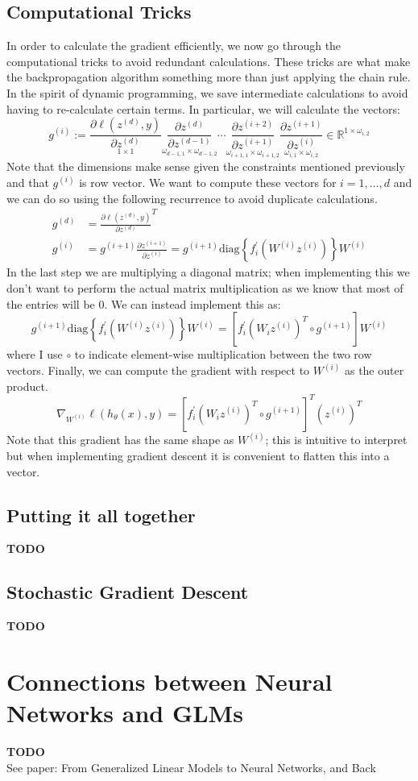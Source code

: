 \documentclass[12pt]{article}
\newcommand{\R}{\mathcal{R}}
\def\R{\mathbb{R}}
\begin{document}
\subsection{Computational Tricks}
In order to calculate the gradient efficiently, we now go through the computational tricks to avoid redundant calculations. These tricks are what make the backpropagation algorithm something more than 
just applying the chain rule. In the spirit of dynamic programming, we save intermediate calculations to avoid having to re-calculate certain terms. In particular, we will calculate the vectors: 
\[g^{(i)} := \underset{1 \times 1}{\frac{\partial \ell(z^{(d)}, y)}{\partial z^{(d)}}} \underset{\omega_{d - 1, 1} \times \omega_{d - 1, 2}}{\frac{\partial z^{(d)}}{\partial z^{(d - 1)}}} \cdots \underset{\omega_{i + 1, 1} \times \omega_{i + 1, 2}}{\frac{\partial z^{(i + 2)}}{\partial z^{(i + 1)}}}  \underset{\omega_{i, 1} \times \omega_{i, 2}}{\frac{\partial z^{(i + 1)}}{\partial z^{(i)}}} \in \R^{1 \times \omega_{i, 2}} \]
Note that the dimensions make sense given the constraints mentioned previously and that $g^{(i)}$ is row vector. We want to compute these vectors for $i = 1, \dots, d$ and we can do so using the following 
recurrence to avoid duplicate calculations. 
\begin{align*}
g^{(d)} &= \frac{\partial \ell(z^{(d)}, y)}{\partial z^{(d)}}^T \\
g^{(i)} &= g^{(i + 1)} \frac{\partial z^{(i + 1)}}{\partial z^{(i)}} = g^{(i + 1)} \text{diag}\left\{f_{i}^\prime(W^{(i)}z^{(i)})\right\} W^{(i)}
\end{align*}
In the last step we are multiplying a diagonal matrix; when implementing this we don't want to perform the actual matrix multiplication as we know that most of the entries will be $0$. We can instead implement
this as: 
\[g^{(i + 1)} \text{diag}\left\{f_{i}^\prime(W^{(i)}z^{(i)})\right\} W^{(i)} = \left[f_i^\prime(W_i z^{(i)})^T \circ g^{(i + 1)}\right]W^{(i)}\]
where I use $\circ$ to indicate element-wise multiplication between the two row vectors. Finally, we can compute the gradient with respect to $W^{(i)}$ as the outer product. 
\[\nabla_{W^{(i)}} \ell(h_\theta(x), y) = \left[f_i^\prime(W_i z^{(i)})^T \circ g^{(i + 1)}\right]^T \left(z^{(i)}\right)^T\]
Note that this gradient has the same shape as $W^{(i)}$; this is intuitive to interpret but when implementing gradient descent it is convenient to flatten this into a vector. 


\subsection{Putting it all together}
\textbf{TODO}

\subsection{Stochastic Gradient Descent}
\textbf{TODO}


\section{Connections between Neural Networks and GLMs}
\textbf{TODO}\\
See paper: From Generalized Linear Models to Neural Networks, and Back
\end{document}
